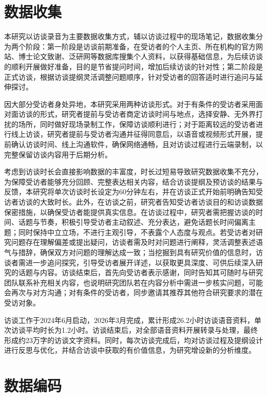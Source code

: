 \section{数据收集}

本研究以访谈录音为主要数据收集方式，辅以访谈过程中的现场笔记，数据收集分为两个阶段：第一阶段是访谈前期准备，在受访者的个人主页、所在机构的官方网站、博士论文致谢、泛研网等数据库搜集个人资料，以获得基础信息，为后续访谈的顺利开展做好准备，目的是节省提问时间，增加后续访谈的针对性；第二阶段是正式访谈，根据访谈提纲灵活调整问题顺序，针对受访者的回答适时进行追问与延伸探讨。

因大部分受访者身处异地，本研究采用两种访谈形式。对于有条件的受访者采用面对面访谈的形式，研究者提前与受访者商定访谈时间与地点，选择安静、无外界打扰的场所，同时做好现场录制工作，保障访谈顺利进行；对于距离较远的受访者进行线上访谈，研究者提前与受访者沟通并征得同意后，以语音或视频形式开展，提前确认访谈时间、线上沟通软件，确保网络通畅，且对访谈过程进行云端录制，以完整保留访谈内容用于后期分析。

考虑到访谈时长会直接影响数据的丰富度，时长过短易导致研究数据收集不充分，为保障受访者能够充分回顾、完整表达相关内容，结合访谈提纲及预访谈的结果与反馈，本研究将单次访谈时长设定为60分钟左右，并在访谈正式开始前明确告知受访者访谈的大致时长。此外，在访谈之前，研究者告知受访者访谈目的和访谈数据保密措施，以确保受访者能提供真实信息。在访谈过程中，研究者需把握访谈的时间、话题与节奏，积极引导受访者主动叙述、充分表达，避免话题长时间偏离主题；同时保持中立立场，不进行主观引导，不表露个人态度与观点。若受访者对研究问题存在理解偏差或提出疑问，访谈者需及时对问题进行阐释，灵活调整表述语气与措辞，确保双方对问题的理解达成一致；当挖掘到具有研究价值的信息时，访谈者需进一步追问探究，引导受访者展开详述，以获取更具深度、可供后续深入研究的话题与内容。访谈结束后，首先向受访者表示感谢，同时告知其可随时与研究团队联系补充相关内容，也说明研究团队若在内容分析中需进一步核实问题，可能会再次与对方沟通；对有条件的受访者，同步邀请其推荐其他符合研究要求的潜在受访对象。

访谈工作于2024年6月启动，2026年3月完成，累计形成26.2小时访谈语音资料，单次访谈平均时长为1.2小时\cite{sunxiaoe2011}。访谈结束后，对全部语音资料开展转录与处理，最终形成约23万字的访谈文字资料。同时，每次访谈完成后，均对访谈过程及提纲设计进行反思与优化，并结合访谈中获取的有价值信息，为研究增设新的分析维度。

\section{数据编码}

